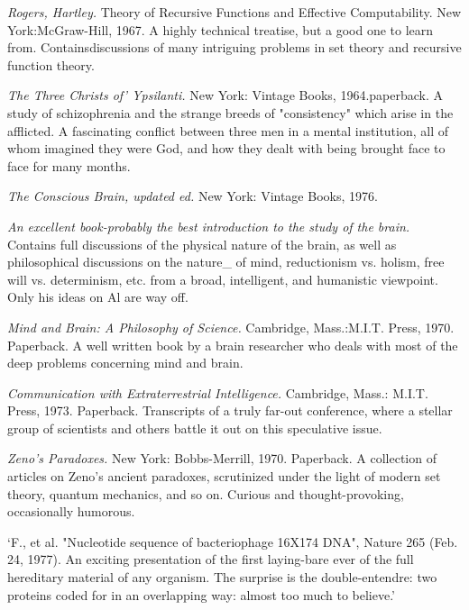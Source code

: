  {\sl Rogers, Hartley.} Theory of Recursive Functions and Effective Computability. New York:McGraw-Hill, 1967. A highly technical treatise, but a good one to learn from. Containsdiscussions of many intriguing problems in set theory and recursive function theory.

 {\sl The Three Christs of' Ypsilanti.} New York: Vintage Books, 1964.paperback. A study of schizophrenia and the strange breeds of "consistency" which arise in the afflicted. A fascinating conflict between three men in a mental institution, all of whom imagined they were God, and how they dealt with being brought face to face for many months.

 {\sl The Conscious Brain, updated ed.} New York: Vintage Books, 1976.

 {\sl An excellent book-probably the best introduction to the study of the brain.} Contains full discussions of the physical nature of the brain, as well as philosophical discussions on the nature\_ of mind, reductionism vs. holism, free will vs. determinism, etc. from a broad, intelligent, and humanistic viewpoint. Only his ideas on Al are way off.

 {\sl Mind and Brain: A Philosophy of Science.} Cambridge, Mass.:M.I.T. Press, 1970. Paperback. A well written book by a brain researcher who deals with most of the deep problems concerning mind and brain.

 {\sl Communication with Extraterrestrial Intelligence.} \llap{*\enspace}Cambridge, Mass.: M.I.T. Press, 1973. Paperback. Transcripts of a truly far-out conference, where a stellar group of scientists and others battle it out on this speculative issue.

 {\sl Zeno's Paradoxes.} New York: Bobbs-Merrill, 1970. Paperback. A collection of articles on Zeno's ancient paradoxes, scrutinized under the light of modern set theory, quantum mechanics, and so on. Curious and thought-provoking, occasionally humorous.

 `F., et al. "Nucleotide sequence of bacteriophage 16X174 DNA", Nature 265 (Feb. 24, 1977). An exciting presentation of the first laying-bare ever of the full hereditary material of any organism. The surprise is the double-entendre: two proteins coded for in an overlapping way: almost too much to believe.' 

